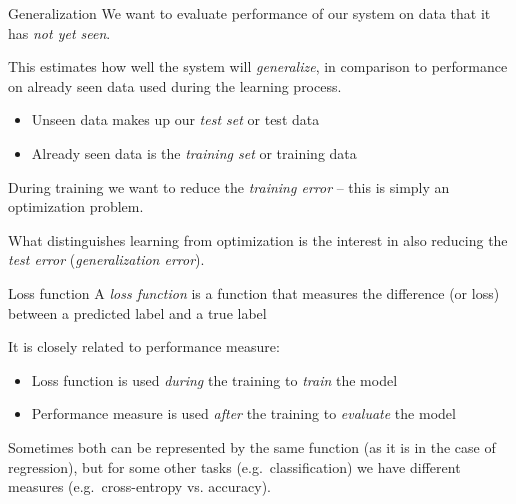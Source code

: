 \documentclass[dvipsnames]{beamer}
\def\eg{e.g.\ }
\begin{document}
		\begin{frame}{Generalization}
		We want to evaluate performance of our system on data that it has \emph{not yet seen}. %
		
		This estimates how well the system will \emph{generalize}, in comparison to performance on already seen data used during the learning process. 
		\begin{itemize}
			\item Unseen data makes up our \emph{test set} or test data %
			\item Already seen data is the \emph{training set} or training data %
		\end{itemize}

	  During training we want to reduce the \emph{training error} -- this is simply an optimization problem.  %
		
		What distinguishes learning from optimization is the interest in also reducing the \emph{test error} (\emph{generalization error}).
		\end{frame}
		
				\begin{frame}{Loss function}
			A \emph{loss function} is a function that measures the difference (or loss) between a predicted label and a true label %
			
			It is closely related to performance measure: %
			\begin{itemize}
				\item Loss function is used \emph{during} the training to \emph{train} the model %
				\item Performance measure is used \emph{after} the training to \emph{evaluate} the model %
			\end{itemize}
			
			Sometimes both can be represented by the same function (as it is in the case of regression), but for some other tasks (\eg classification) we have different measures (\eg cross-entropy vs. accuracy).
		\end{frame}
		
\end{document}
